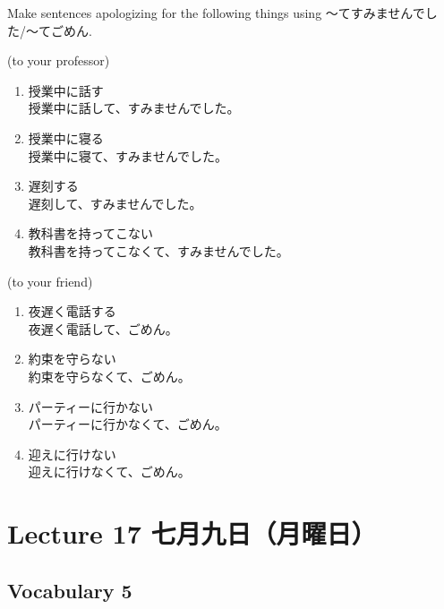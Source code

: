 \documentclass[notoc,notitlepage]{tufte-book}
\begin{document}
\begin{ex}
  Make sentences apologizing for the following things using 〜てすみませんでした/〜てごめん.

  \noindent (to your professor)
  \begin{enumerate}
    \item 授業中に話す \\
      授業中に話して、すみませんでした。
    \item 授業中に寝る \\
      授業中に寝て、すみませんでした。
    \item 遅刻する \\
      遅刻して、すみませんでした。
    \item 教科書を持ってこない \\
      教科書を持ってこなくて、すみませんでした。
  \end{enumerate}

  \noindent (to your friend)
  \begin{enumerate}
    \item 夜遅く電話する \\
      夜遅く電話して、ごめん。
    \item 約束を守らない \\
      約束を守らなくて、ごめん。
    \item パーティーに行かない \\
      パーティーに行かなくて、ごめん。
    \item 迎えに行けない \\
      迎えに行けなくて、ごめん。
  \end{enumerate}
\end{ex}



\chapter{Lecture 17 七月九日（月曜日）}%
\label{chp:lecture_17_qi_yue_jiu_ri_yue_yao_ri_}

\section{Vocabulary 5}%
\label{sec:vocabulary_5}
\end{document}
